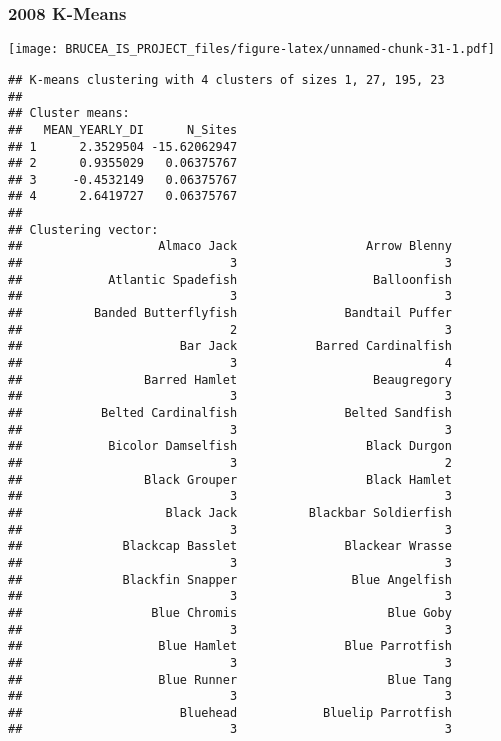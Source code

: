 \documentclass[
]{article}
\begin{document}
\hypertarget{k-means-5}{%
\subsubsection{2008 K-Means}\label{k-means-5}}

\texttt{[image: BRUCEA\_IS\_PROJECT\_files/figure-latex/unnamed-chunk-31-1.pdf]}

\begin{verbatim}
## K-means clustering with 4 clusters of sizes 1, 27, 195, 23
## 
## Cluster means:
##   MEAN_YEARLY_DI      N_Sites
## 1      2.3529504 -15.62062947
## 2      0.9355029   0.06375767
## 3     -0.4532149   0.06375767
## 4      2.6419727   0.06375767
## 
## Clustering vector:
##                   Almaco Jack                  Arrow Blenny 
##                             3                             3 
##            Atlantic Spadefish                   Balloonfish 
##                             3                             3 
##          Banded Butterflyfish               Bandtail Puffer 
##                             2                             3 
##                      Bar Jack           Barred Cardinalfish 
##                             3                             4 
##                 Barred Hamlet                   Beaugregory 
##                             3                             3 
##           Belted Cardinalfish               Belted Sandfish 
##                             3                             3 
##            Bicolor Damselfish                  Black Durgon 
##                             3                             2 
##                 Black Grouper                  Black Hamlet 
##                             3                             3 
##                    Black Jack          Blackbar Soldierfish 
##                             3                             3 
##              Blackcap Basslet               Blackear Wrasse 
##                             3                             3 
##              Blackfin Snapper                Blue Angelfish 
##                             3                             3 
##                  Blue Chromis                     Blue Goby 
##                             3                             3 
##                   Blue Hamlet               Blue Parrotfish 
##                             3                             3 
##                   Blue Runner                     Blue Tang 
##                             3                             3 
##                      Bluehead            Bluelip Parrotfish 
##                             3                             3 

\end{verbatim}
\end{document}
